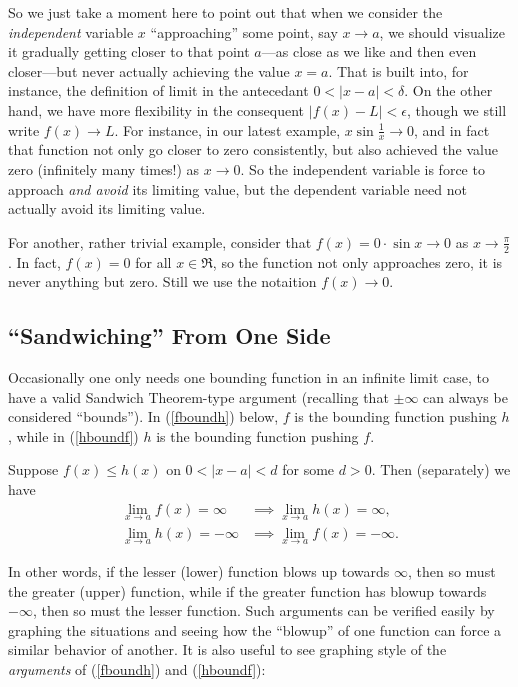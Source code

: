 So we just take a moment here
to point out that when we consider the {\it independent}
variable $x$ ``approaching'' some point, say $x\longrightarrow a$, 
we should visualize it 
gradually getting closer to that point $a$---as close as we like and
then even closer---but never actually achieving the value $x=a$.
That is built into, for instance, the definition of limit in the antecedant
$0<|x-a|<\delta$.
On the other hand, we have more flexibility in the consequent
$|f(x)-L|<\epsilon$, though we still write
$f(x)\longrightarrow L$.  For instance, in our latest example,
$x\sin\frac1x\longrightarrow0$, and in fact that function
not only go closer to zero consistently, but also achieved the
value zero (infinitely many times!) as $x\to0$.  So the independent
variable is force to approach {\it and avoid} its limiting
value, but the dependent variable need not actually avoid its
limiting value.

For another, rather trivial
example, consider that $f(x)=0\cdot\sin x\longrightarrow
0$ as $x\to\frac{\pi}2$.  In fact, $f(x)=0$ for all $x\in\Re$,
so the function not only approaches zero, it is never anything but
zero.  Still we use the notaition $f(x)\longrightarrow0$.















\subsection{``Sandwiching'' From One Side}

Occasionally  one only needs one bounding function in an
infinite limit case, to have a valid Sandwich Theorem-type argument
(recalling that $\pm\infty$ can always be considered ``bounds'').
In (\ref{fboundh}) below, $f$ is the bounding function pushing $h$, while in
(\ref{hboundf}) $h$ is the bounding function pushing $f$.
\begin{theorem} Suppose $f(x)\le h(x)$ on $0<|x-a|<d$
for some $d>0$.  Then (separately) we have
\begin{align}
\lim_{x\to a}f(x)=\infty&\implies \lim_{x\to a}h(x)=\infty,\label{fboundh}\\
\lim_{x\to a}h(x)=-\infty&\implies \lim_{x\to a}f(x)=-\infty.\label{hboundf}
\end{align}
\end{theorem}
In other words, if the lesser (lower) function blows up towards $\infty$,
then so must the greater (upper) function, while if the greater function
has blowup towards $-\infty$, then so must the lesser function.
Such arguments can be verified easily by graphing
the situations and seeing how the ``blowup'' of one function
can force a similar behavior of another.  It is also useful to see
graphing style of the {\it arguments} of (\ref{fboundh}) and
(\ref{hboundf}):

